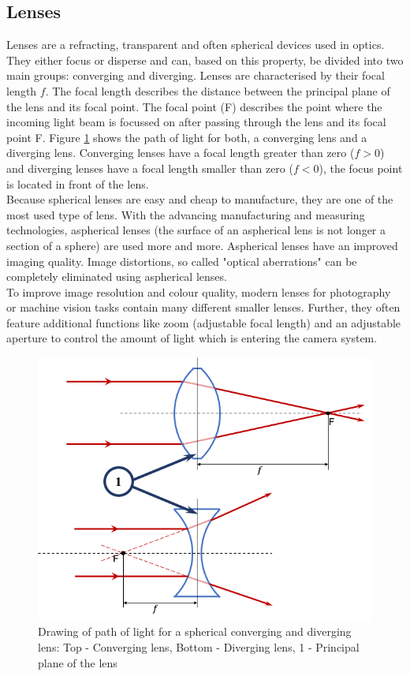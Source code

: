 \subsection{Lenses}
Lenses are a refracting, transparent and often spherical devices used in optics. They either focus or disperse and can, based on this property, be divided into two main groups: converging and diverging. Lenses are characterised by their focal length $f$. The focal length describes the distance between the principal plane of the lens and its focal point. The focal point (F) describes the point where the incoming light beam is focussed on after passing through the lens and its focal point F. Figure \ref{Lens} shows the path of light for both, a converging lens and a diverging lens. Converging lenses have a focal length greater than zero ($f>0$) and diverging lenses have a focal length smaller than zero ($f<0$), the focus point is located in front of the lens.\cite{LoefflerLang2020}\\
Because spherical lenses are easy and cheap to manufacture, they are one of the most used type of lens. With the advancing manufacturing and measuring technologies, aspherical lenses (the surface of an aspherical lens is not longer a section of a sphere) are used more and more. Aspherical lenses have an improved imaging quality. Image distortions, so called "optical aberrations" can be completely eliminated using aspherical lenses.\\
To improve image resolution and colour quality, modern lenses for photography or machine vision tasks contain many different smaller lenses. Further, they often feature additional functions like zoom (adjustable focal length) and an adjustable aperture to control the amount of light which is entering the camera system.\cite{LoefflerLang2020}\cite{ThorlabsMachineVisionLenses}

\begin{figure}
\begin{center}
\includegraphics[width=12cm]{Pictures/Lenses}
\caption[Drawing of path of light for a spherical converging and diverging lens]{Drawing of path of light for a spherical converging and diverging lens: Top - Converging lens, Bottom - Diverging lens, 1 - Principal plane of the lens}
\label{Lens}
\end{center}
\end{figure}

